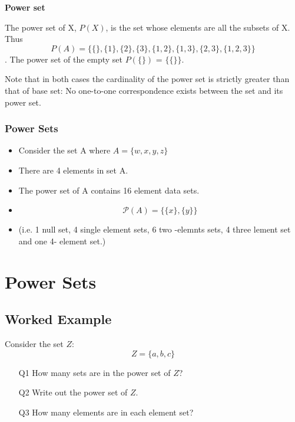 \documentclass[11pt,a4paper,titlepage,oneside,openany]{article}
\numberwithin{equation}{section}
\numberwithin{algorithm}{section}
\numberwithin{figure}{section}
\numberwithin{table}{section}
\begin{document}
\textbf{Power set}

The power set of X, $P(X)$, is the set whose elements are all the subsets of X. Thus \[P(A) = \{ \{\}, \{1\}, \{2\}, \{3\}, \{1,2\}, \{1,3\}, \{2,3\}, \{1,2,3\}\}\]. The power set of the empty set $P(\{\})$ = $\{\{\}\}$. 

Note that in both cases the cardinality of the power set is strictly greater than that of base set: No one-to-one correspondence exists between the set and its power set. 


\newpage



\subsubsection*{Power Sets}

\begin{itemize}

\item Consider the set A where $ A = \{w,x,y,z\}$
\item There are 4 elements in set A.

\item The power set of A contains 16 element data sets.

\item \[  \mathcal{P}(A) = \{\{ x \}, \{ y \} \}  \]

\item (i.e. 1 null set, 4 single element sets, 6 two -elemnts sets, 4 three lement set and one 4- element set.)

\end{itemize}


\section*{Power Sets}
\subsection*{Worked Example}
Consider the set $Z$:
\[ Z = \{ a,b,c\}  \]
\begin{itemize}
\item[Q1] How many sets are in the power set of $Z$? 
\item[Q2] Write out the power set of $Z$. 
\item[Q3] How many elements are in each element set?
\end{itemize}
\end{document}
